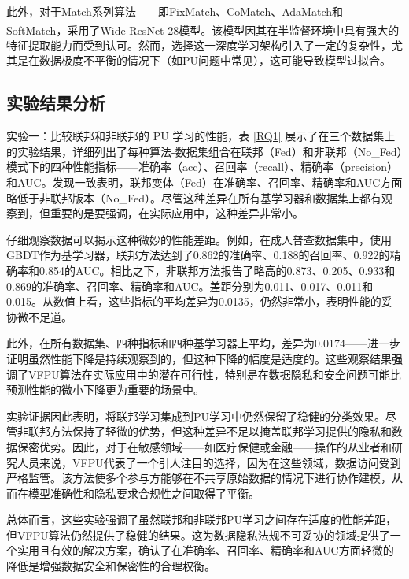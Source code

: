 此外，对于Match系列算法——即FixMatch、CoMatch、AdaMatch和SoftMatch，采用了Wide ResNet-28模型\textsuperscript{\cite{oliver2018realistic}}。该模型因其在半监督环境中具有强大的特征提取能力而受到认可。然而，选择这一深度学习架构引入了一定的复杂性，尤其是在数据极度不平衡的情况下（如PU问题中常见），这可能导致模型过拟合。

\subsection{实验结果分析}
实验一：比较联邦和非联邦的 PU 学习的性能，表 \ref{RQ1} 展示了在三个数据集上的实验结果，详细列出了每种算法-数据集组合在联邦（Fed）和非联邦（No\_Fed）模式下的四种性能指标——准确率（acc）、召回率（recall）、精确率（precision）和AUC。发现一致表明，联邦变体（Fed）在准确率、召回率、精确率和AUC方面略低于非联邦版本（No\_Fed）。尽管这种差异在所有基学习器和数据集上都有观察到，但重要的是要强调，在实际应用中，这种差异非常小。

仔细观察数据可以揭示这种微妙的性能差距。例如，在成人普查数据集中，使用GBDT作为基学习器，联邦方法达到了0.862的准确率、0.188的召回率、0.922的精确率和0.854的AUC。相比之下，非联邦方法报告了略高的0.873、0.205、0.933和0.869的准确率、召回率、精确率和AUC。差距分别为0.011、0.017、0.011和0.015。从数值上看，这些指标的平均差异为0.0135，仍然非常小，表明性能的妥协微不足道。

此外，在所有数据集、四种指标和四种基学习器上平均，差异为0.0174——进一步证明虽然性能下降是持续观察到的，但这种下降的幅度是适度的。这些观察结果强调了VFPU算法在实际应用中的潜在可行性，特别是在数据隐私和安全问题可能比预测性能的微小下降更为重要的场景中。

实验证据因此表明，将联邦学习集成到PU学习中仍然保留了稳健的分类效果。尽管非联邦方法保持了轻微的优势，但这种差异不足以掩盖联邦学习提供的隐私和数据保密优势。因此，对于在敏感领域——如医疗保健或金融——操作的从业者和研究人员来说，VFPU代表了一个引人注目的选择，因为在这些领域，数据访问受到严格监管。该方法使多个参与方能够在不共享原始数据的情况下进行协作建模，从而在模型准确性和隐私要求合规性之间取得了平衡。

总体而言，这些实验强调了虽然联邦和非联邦PU学习之间存在适度的性能差距，但VFPU算法仍然提供了稳健的结果。这为数据隐私法规不可妥协的领域提供了一个实用且有效的解决方案，确认了在准确率、召回率、精确率和AUC方面轻微的降低是增强数据安全和保密性的合理权衡。

